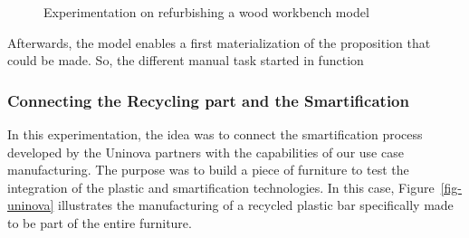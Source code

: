 \documentclass[
  11pt,
]{article}
\begin{document}
\begin{figure}
\begin{minipage}[t]{0.60\linewidth}
{\centering 


}

\end{minipage}%

\caption{\label{fig-demo2}Experimentation on refurbishing a wood
workbench model}

\end{figure}

Afterwards, the model enables a first materialization of the proposition
that could be made. So, the different manual task started in function

\hypertarget{connecting-the-recycling-part-and-the-smartification}{%
\subsubsection{Connecting the Recycling part and the
Smartification}\label{connecting-the-recycling-part-and-the-smartification}}

In this experimentation, the idea was to connect the smartification
process developed by the Uninova partners with the capabilities of our
use case manufacturing. The purpose was to build a piece of furniture to
test the integration of the plastic and smartification technologies. In
this case, Figure~\ref{fig-uninova} illustrates the manufacturing of a
recycled plastic bar specifically made to be part of the entire
furniture.
\end{document}
